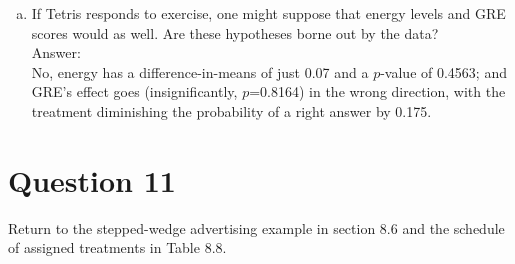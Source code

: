 \documentclass[11pt,notitlepage]{article}\usepackage[]{graphicx}\usepackage[]{color}
\begin{document}
\begin{enumerate}[a)]
\item If Tetris responds to exercise, one might suppose that energy levels and GRE scores would as well. Are these hypotheses borne out by the data?\\
Answer:\\
No, energy has a difference-in-means of just 0.07 and a $p$-value of 0.4563; and GRE's effect goes (insignificantly, $p$=0.8164) in the wrong direction, with the treatment diminishing the probability of a right answer by 0.175.
\end{enumerate}

\section*{Question 11}
Return to the stepped-wedge advertising example in section 8.6 and the schedule of assigned treatments in Table 8.8.
\end{document}
